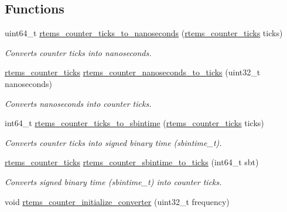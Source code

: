 \subsection*{Functions}
\begin{DoxyCompactItemize}
\item 
uint64\+\_\+t \mbox{\hyperlink{group__ClassicCounter_ga3e50a042e60bfcafdff5dbd46cad8947}{rtems\+\_\+counter\+\_\+ticks\+\_\+to\+\_\+nanoseconds}} (\mbox{\hyperlink{group__ClassicCounter_gafda796220404920ac0af841d9f555262}{rtems\+\_\+counter\+\_\+ticks}} ticks)
\begin{DoxyCompactList}\small\item\em Converts counter ticks into nanoseconds. \end{DoxyCompactList}\item 
\mbox{\hyperlink{group__ClassicCounter_gafda796220404920ac0af841d9f555262}{rtems\+\_\+counter\+\_\+ticks}} \mbox{\hyperlink{group__ClassicCounter_ga9a475dea5b0d7689a94f0806cf21f396}{rtems\+\_\+counter\+\_\+nanoseconds\+\_\+to\+\_\+ticks}} (uint32\+\_\+t nanoseconds)
\begin{DoxyCompactList}\small\item\em Converts nanoseconds into counter ticks. \end{DoxyCompactList}\item 
int64\+\_\+t \mbox{\hyperlink{group__ClassicCounter_ga57c10408f9570d199408745197f014de}{rtems\+\_\+counter\+\_\+ticks\+\_\+to\+\_\+sbintime}} (\mbox{\hyperlink{group__ClassicCounter_gafda796220404920ac0af841d9f555262}{rtems\+\_\+counter\+\_\+ticks}} ticks)
\begin{DoxyCompactList}\small\item\em Converts counter ticks into signed binary time (sbintime\+\_\+t). \end{DoxyCompactList}\item 
\mbox{\hyperlink{group__ClassicCounter_gafda796220404920ac0af841d9f555262}{rtems\+\_\+counter\+\_\+ticks}} \mbox{\hyperlink{group__ClassicCounter_ga2cc1e89d4abdd736de597533ee747187}{rtems\+\_\+counter\+\_\+sbintime\+\_\+to\+\_\+ticks}} (int64\+\_\+t sbt)
\begin{DoxyCompactList}\small\item\em Converts signed binary time (sbintime\+\_\+t) into counter ticks. \end{DoxyCompactList}\item 
void \mbox{\hyperlink{group__ClassicCounter_gac05da1fad44ca8d492d00b3890b80415}{rtems\+\_\+counter\+\_\+initialize\+\_\+converter}} (uint32\+\_\+t frequency)

\end{DoxyCompactItemize}
